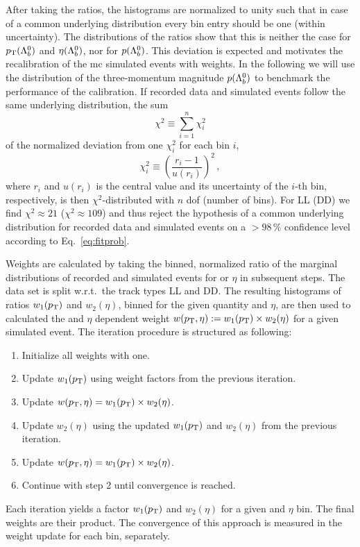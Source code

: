After taking the ratios, the histograms are normalized to unity such that in case of a common underlying distribution every bin entry should be one (within uncertainty).
The distributions of the ratios show that this is neither the case for $\mbox{$p_{\mathrm{ T}}$}({{\Lambda}^0_{b}})$ and $\eta({{\Lambda}^0_{b}})$, nor for $p({{\Lambda}^0_{b}})$.
This deviation is expected and motivates the recalibration of the \gls{mc} simulated events with weights.
In the following we will use the distribution of the three-momentum magnitude $p({{\Lambda}^0_{b}})$ to benchmark the performance of the calibration.
If recorded data and simulated events follow the same underlying distribution, the sum
\begin{equation*}
    \chi^2 \equiv \sum_{i=1}^n \chi_i^2
\end{equation*}
of the normalized deviation from one $\chi_i^2$ for each bin $i$,
\begin{equation*}
    \chi_i^2 \equiv \left( \frac{r_i - 1}{u(r_i)} \right)^2 \,,
\end{equation*}
where $r_i$ and $u(r_i)$ is the central value and its uncertainty of the $i$-th bin, respectively, is then $\chi^2$-distributed with $n$ \gls{dof} (number of bins).
For \gls{LL} (\gls{DD}) we find $\chi^2 \approx 21$ ($\chi^2 \approx 109$) and thus reject the hypothesis of a common underlying distribution for recorded data and simulated events on a $>98\,\%$ confidence level according to Eq.~\eqref{eq:fitprob}.

Weights are calculated by taking the binned, normalized ratio of the marginal distributions of recorded and simulated events for \pt or $\eta$ in subsequent steps.
The data set is split w.r.t.\ the track types \gls{LL} and \gls{DD}.
The resulting histograms of ratios $w_1(\mbox{$p_{\mathrm{ T}}$})$ and $w_2(\eta)$, binned for the given quantity \pt and $\eta$, are then used to calculated the \pt and $\eta$ dependent weight $w(\mbox{$p_{\mathrm{ T}}$}, \eta) := w_1(\mbox{$p_{\mathrm{ T}}$}) \times w_2(\eta)$ for a given simulated event.
The iteration procedure is structured as following:
\begin{enumerate}[itemsep=2pt,parsep=2pt]
    \item Initialize all weights with one.
    \item Update $w_1(\mbox{$p_{\mathrm{ T}}$})$ using weight factors from the previous iteration.
    \item Update $w(\mbox{$p_{\mathrm{ T}}$}, \eta) = w_1(\mbox{$p_{\mathrm{ T}}$}) \times w_2(\eta)$.
    \item Update $w_2(\eta)$ using the updated $w_1(\mbox{$p_{\mathrm{ T}}$})$ and $w_2(\eta)$ from the previous iteration.
    \item Update $w(\mbox{$p_{\mathrm{ T}}$}, \eta) = w_1(\mbox{$p_{\mathrm{ T}}$}) \times w_2(\eta)$.
    \item Continue with step 2 until convergence is reached. 
\end{enumerate}
Each iteration yields a factor $w_1(\mbox{$p_{\mathrm{ T}}$})$ and $w_2(\eta)$ for a given \pt and $\eta$ bin.
The final weights are their product.
The convergence of this approach is measured in the weight update for each bin, separately.

